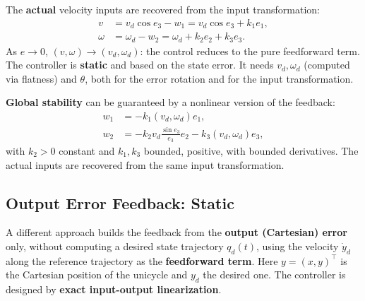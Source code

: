 The \textbf{actual} velocity inputs are recovered from the input
transformation:
\begin{align}
    v &= v_d \cos e_3 - w_1 = v_d \cos e_3 + k_1 e_1, \\
    \omega &= \omega_d - w_2 = \omega_d + k_2 e_2 + k_3 e_3.
\end{align}
As \( e \to 0 \), \( (v, \omega) \to (v_d, \omega_d) \): the control
reduces to the pure feedforward term. The controller is \textbf{static}
and based on the state error. It needs \( v_d, \omega_d \) (computed
via flatness) and \( \theta \), both for the error rotation and for
the input transformation.

\textbf{Global stability} can be guaranteed by a nonlinear version of
the feedback:
\begin{align}
    w_1 &= -k_1(v_d, \omega_d) e_1, \\
    w_2 &= -k_2 v_d \frac{\sin e_3}{e_3} e_2
           - k_3(v_d, \omega_d) e_3,
\end{align}
with \( k_2 > 0 \) constant and \( k_1, k_3 \) bounded, positive, with
bounded derivatives. The actual inputs are recovered from the same
input transformation.

\subsection{Output Error Feedback: Static}
\label{subsec:output-error-static}

A different approach builds the feedback from the \textbf{output
(Cartesian) error} only, without computing a desired state trajectory
\( q_d(t) \), using the velocity \( \dot{y}_d \) along the reference
trajectory as the \textbf{feedforward term}. Here
\( y = (x, y)^\top \) is the Cartesian position of the unicycle and
\( y_d \) the desired one. The controller is designed by
\textbf{exact input-output linearization}.

